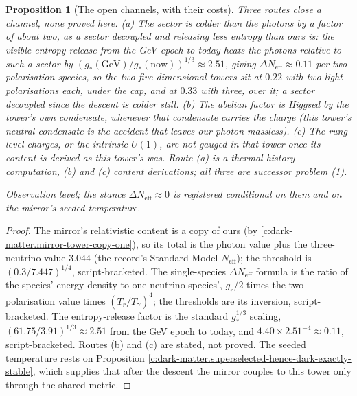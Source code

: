 \documentclass[11pt]{article}
\newtheorem{proposition}[theorem]{Proposition}
\theoremstyle{definition}
\theoremstyle{plain}
\providecommand{\Neff}{}\renewcommand{\Neff}{N_{\mathrm{eff}}}
\begin{document}
\begin{proposition}[The open channels, with their costs]
Three routes close a channel, none proved here. (a) The sector is colder than the photons by a factor of about two, as a sector decoupled and releasing less entropy than ours is: the visible entropy release from the GeV epoch to today heats the photons relative to such a sector by $(g_{*}(\mathrm{GeV})/g_{*}(\mathrm{now}))^{1/3} \approx 2.51$, giving $\Delta\Neff \approx 0.11$ per two-polarisation species, so the two five-dimensional towers sit at $0.22$ with two light polarisations each, under the cap, and at $0.33$ with three, over it; a sector decoupled since the descent is colder still. (b) The abelian factor is Higgsed by the tower's own condensate, whenever that condensate carries the charge (this tower's neutral condensate is the accident that leaves our photon massless). (c) The rung-level charges, or the intrinsic $U(1)$, are not gauged in that tower once its content is derived as this tower's was. Route (a) is a thermal-history computation, (b) and (c) content derivations; all three are successor problem (1).

Observation level; the stance $\Delta\Neff \approx 0$ is registered conditional on them and on the mirror's seeded temperature.
\end{proposition}
\begin{proof}
The mirror's relativistic content is a copy of ours (by \ref{c:dark-matter.mirror-tower-copy-one}), so its total is the photon value plus the three-neutrino value $3.044$ (the record's Standard-Model $\Neff$); the threshold is $(0.3/7.447)^{1/4}$, script-bracketed. The single-species $\Delta\Neff$ formula is the ratio of the species' energy density to one neutrino species', $g_{r}/2$ times the two-polarisation value times $(T_{r}/T_{\gamma})^{4}$; the thresholds are its inversion, script-bracketed. The entropy-release factor is the standard $g_{*}^{1/3}$ scaling, $(61.75/3.91)^{1/3} \approx 2.51$ from the GeV epoch to today, and $4.40 \times 2.51^{-4} \approx 0.11$, script-bracketed. Routes (b) and (c) are stated, not proved. The seeded temperature rests on Proposition \ref{c:dark-matter.superselected-hence-dark-exactly-stable}, which supplies that after the descent the mirror couples to this tower only through the shared metric.

\end{proof}
\end{document}
